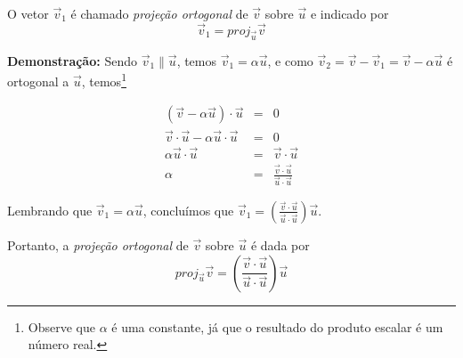 O vetor $\vec v_1$ é chamado \textit{projeção ortogonal} de $\vec v$ sobre $\vec u$ e indicado por $$\vec v_1=proj_{\vec u}\vec v$$

\textbf{Demonstração:} Sendo $\vec v_1\parallel \vec u$, temos $\vec v_1=\alpha \vec u$, e como $\vec v_2=\vec v-\vec v_1=\vec v-\alpha\vec u$ é ortogonal a $\vec u$, temos\footnote{Observe que $\alpha$ é uma constante, já que o resultado do produto escalar é um número real.}

\begin{eqnarray*}
(\vec v-\alpha \vec u) \cdot \vec u & = & 0 \\
\vec v \cdot \vec u-\alpha \vec u \cdot \vec u& = &  0\\
\alpha \vec u \cdot \vec u& = &  \vec v \cdot \vec u\\
\alpha & = & \frac{\vec v \cdot \vec u}{\vec u \cdot \vec u}
\end{eqnarray*}

Lembrando que $\vec v_1=\alpha \vec u$, concluímos que  $\vec v_1= \left(\frac{\vec v \cdot \vec u}{\vec u \cdot \vec u}\right) \vec u$.

Portanto, a \textit{projeção ortogonal} de $\vec v$ sobre $\vec u$ é dada por $$proj_{\vec u}\vec v=\left(\frac{\vec v \cdot \vec u}{\vec u \cdot \vec u}\right) \vec u$$